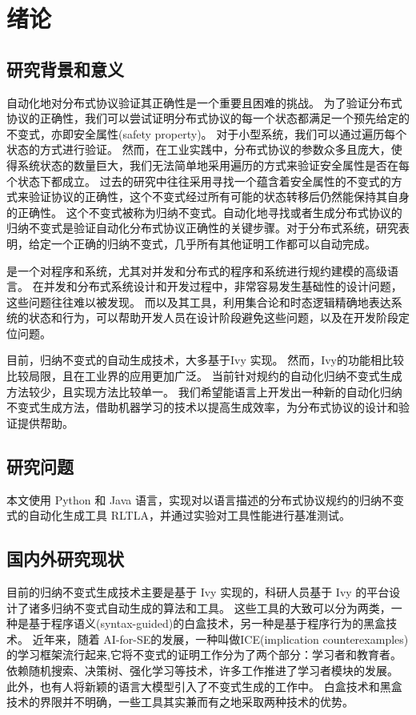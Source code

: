 \chapter{绪论}

\section{研究背景和意义}
自动化地对分布式协议验证其正确性是一个重要且困难的挑战。
为了验证分布式协议的正确性，我们可以尝试证明分布式协议的每一个状态都满足一个预先给定的不变式，亦即安全属性(safety property)。
对于小型系统，我们可以通过遍历每个状态的方式进行验证。
然而，在工业实践中，分布式协议的参数众多且庞大，使得系统状态的数量巨大，我们无法简单地采用遍历的方式来验证安全属性是否在每个状态下都成立。
过去的研究中往往采用寻找一个蕴含着安全属性的不变式的方式来验证协议的正确性，这个不变式经过所有可能的状态转移后仍然能保持其自身的正确性。
这个不变式被称为归纳不变式。自动化地寻找或者生成分布式协议的归纳不变式是验证自动化分布式协议正确性的关键步骤。对于分布式系统，研究表明，给定一个正确的归纳不变式，几乎所有其他证明工作都可以自动完成。

\TLA \cite{TLA+}是一个对程序和系统，尤其对并发和分布式的程序和系统进行规约建模的高级语言。
在并发和分布式系统设计和开发过程中，非常容易发生基础性的设计问题，这些问题往往难以被发现。
而\TLA 以及其工具，利用集合论和时态逻辑精确地表达系统的状态和行为，可以帮助开发人员在设计阶段避免这些问题，以及在开发阶段定位问题。

目前，归纳不变式的自动生成技术，大多基于Ivy \cite{Ivy} 实现。
然而，Ivy的功能相比较\TLA 比较局限，且\TLA 在工业界的应用更加广泛。
当前针对\TLA 规约的自动化归纳不变式生成方法较少，且实现方法比较单一。
我们希望能\TLA 语言上开发出一种新的自动化归纳不变式生成方法，借助机器学习的技术以提高生成效率，为分布式协议的设计和验证提供帮助。

\section{研究问题}
本文使用 Python 和 Java 语言，实现对以\TLA 语言描述的分布式协议规约的归纳不变式的自动化生成工具 RLTLA，并通过实验对工具性能进行基准测试。

\section{国内外研究现状}
目前的归纳不变式生成技术主要是基于 Ivy \cite{Ivy} 实现的，科研人员基于 Ivy 的平台设计了诸多归纳不变式自动生成的算法和工具。
这些工具的大致可以分为两类，一种是基于程序语义(syntax-guided)的白盒技术，另一种是基于程序行为的黑盒技术。
近年来，随着 AI-for-SE的发展，一种叫做ICE\cite{ICE}(implication counterexamples)的学习框架流行起来,它将不变式的证明工作分为了两个部分：学习者和教育者。
依赖随机搜索、决策树\cite{garg2016learning}、强化学习\cite{LIPuS}等技术，许多工作推进了学习者模块的发展。
此外，也有人将新颖的语言大模型引入了不变式生成的工作中\cite{llm}。
白盒技术和黑盒技术的界限并不明确，一些工具其实兼而有之地采取两种技术的优势。

